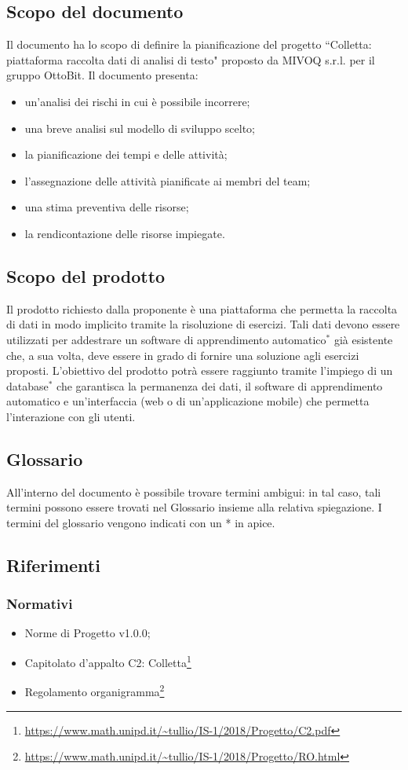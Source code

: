 \subsection{Scopo del documento}
	Il documento ha lo scopo di definire la pianificazione del progetto ``Colletta: piattaforma raccolta dati di analisi di testo" proposto da MIVOQ s.r.l. per il gruppo OttoBit. Il documento presenta:
	\begin{itemize}
		\item un'analisi dei rischi in cui è possibile incorrere;
		\item una breve analisi sul modello di sviluppo scelto;
		\item la pianificazione dei tempi e delle attività;
		\item l'assegnazione delle attività pianificate ai membri del team;
		\item una stima preventiva delle risorse;
		\item la rendicontazione delle risorse impiegate.
	\end{itemize}

\subsection{Scopo del prodotto}
	Il prodotto richiesto dalla proponente è una piattaforma che permetta la raccolta di dati in modo implicito tramite la risoluzione di esercizi. Tali dati devono essere utilizzati per addestrare un software di apprendimento automatico$^*$ già esistente che, a sua volta, deve essere in grado di fornire una soluzione agli esercizi proposti. L'obiettivo del prodotto potrà essere raggiunto tramite l'impiego di un database$^*$ che garantisca la permanenza dei dati, il software di apprendimento automatico e un'interfaccia (web o di un'applicazione mobile) che permetta l'interazione con gli utenti.

\subsection{Glossario}
	All'interno del documento è possibile trovare termini ambigui: in tal caso, tali termini possono essere trovati nel Glossario insieme alla relativa spiegazione. I termini del glossario vengono indicati con un * in apice.
	
\subsection{Riferimenti}
	\subsubsection{Normativi}
		\begin{itemize}
			\item Norme di Progetto v1.0.0;
			\item Capitolato d'appalto C2: Colletta\footnote{\url{https://www.math.unipd.it/~tullio/IS-1/2018/Progetto/C2.pdf}}
			\item Regolamento organigramma\footnote{\url{https://www.math.unipd.it/~tullio/IS-1/2018/Progetto/RO.html}}
		\end{itemize}
